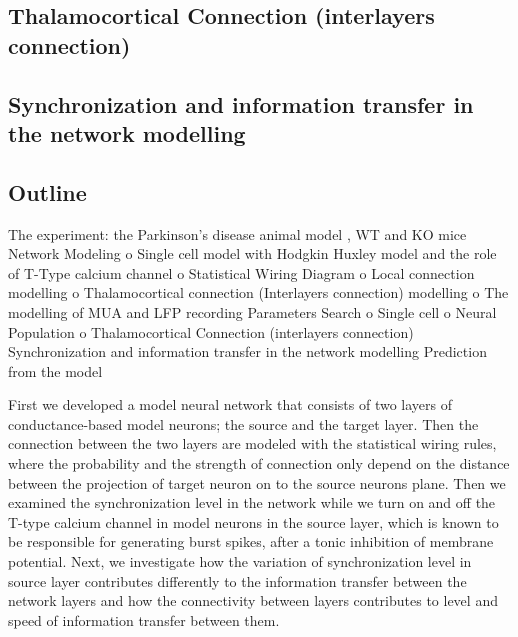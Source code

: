 \subsection{Thalamocortical Connection (interlayers connection)}


\subsection{Synchronization and information transfer in the network modelling}


\subsection{Outline}

The experiment: the Parkinson’s disease animal model , WT and KO mice
Network Modeling
o Single cell model with Hodgkin Huxley model and the role of T-Type calcium channel
o Statistical Wiring Diagram
o Local connection modelling
o Thalamocortical connection (Interlayers connection) modelling
o The modelling of MUA and LFP recording
Parameters Search
o Single cell
o Neural Population
o Thalamocortical Connection (interlayers connection)
Synchronization and information transfer in the network modelling
Prediction from the model

First we developed a model neural network that consists of two layers of conductance-based model neurons; the source and the target layer. Then the connection between the two layers are modeled with the statistical wiring rules, where the probability and the strength of connection only depend on the distance between the projection of target neuron on to the source neurons plane. Then we examined the synchronization level in the network while we turn on and off the T-type calcium channel in model neurons in the source layer, which is known to be responsible for generating burst spikes, after a tonic inhibition of membrane potential. Next, we investigate how the variation of synchronization level in source layer contributes differently to the information transfer between the network layers and how the connectivity between layers contributes to level and speed of information transfer between them. 